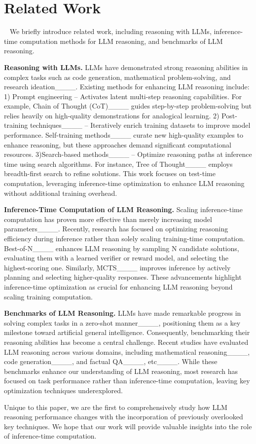 \section{Related Work}
~\label{sec:relected_work}
We briefly introduce related work, including reasoning with LLMs, inference-time computation methods for LLM reasoning, and benchmarks of LLM reasoning.



\textbf{Reasoning with LLMs.}
LLMs have demonstrated strong reasoning abilities in complex tasks such as code generation, mathematical problem-solving, and research ideation____. Existing methods for enhancing LLM reasoning include: 1) Prompt engineering – Activates latent multi-step reasoning capabilities. For example, Chain of Thought (CoT)____ guides step-by-step problem-solving but relies heavily on high-quality demonstrations for analogical learning. 2) Post-training techniques____ – Iteratively enrich training datasets to improve model performance. Self-training methods____ curate new high-quality examples to enhance reasoning, but these approaches demand significant computational resources. 3)Search-based methods____ – Optimize reasoning paths at inference time using search algorithms. For instance, Tree of Thought____ employs breadth-first search to refine solutions.
This work focuses on test-time computation, leveraging inference-time optimization to enhance LLM reasoning without additional training overhead.


\textbf{Inference-Time Computation of LLM Reasoning.} Scaling inference-time computation has proven more effective than merely increasing model parameters____. Recently, research has focused on optimizing reasoning efficiency during inference rather than solely scaling training-time computation. Best-of-N____ enhances LLM reasoning by sampling N candidate solutions, evaluating them with a learned verifier or reward model, and selecting the highest-scoring one. Similarly, MCTS____ improves inference by actively planning and selecting higher-quality responses. These advancements highlight inference-time optimization as crucial for enhancing LLM reasoning beyond scaling training computation.



\textbf{Benchmarks of LLM Reasoning.}  LLMs have made remarkable progress in solving complex tasks in a zero-shot manner____, positioning them as a key milestone toward artificial general intelligence. Consequently, benchmarking their reasoning abilities has become a central challenge. Recent studies have evaluated LLM reasoning across various domains, including mathematical reasoning____, code generation____, and factual QA____, etc____. While these benchmarks enhance our understanding of LLM reasoning, most research has focused on task performance rather than inference-time computation, leaving key optimization techniques underexplored.




Unique to this paper, we are the first to comprehensively study how LLM reasoning performance changes with the incorporation of previously overlooked key techniques. We hope that our work will provide valuable insights into the role of inference-time computation.


\vspace{-0.2in}